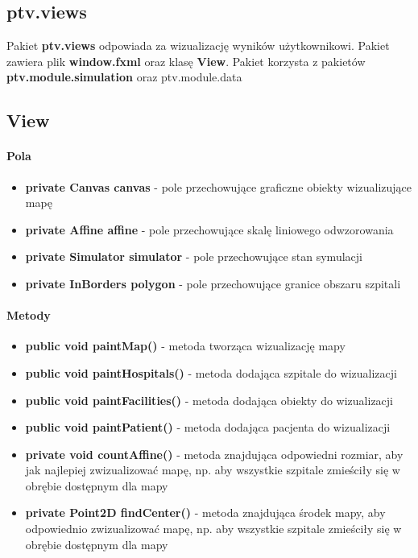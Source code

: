 \documentclass[]{article}
\begin{document}
        \subsection{ptv.views} %
        Pakiet \textbf{ptv.views} odpowiada za wizualizację wyników użytkownikowi. Pakiet zawiera plik \textbf{window.fxml} oraz klasę \textbf{View}. Pakiet korzysta z pakietów \textbf{ptv.module.simulation} oraz {ptv.module.data} 
        \subsection{View}
            \paragraph{Pola}
                    \begin{itemize}
                        \item \textbf{private Canvas canvas} - pole przechowujące graficzne obiekty wizualizujące mapę
                        \item \textbf{private Affine affine} - pole przechowujące skalę liniowego odwzorowania
                        \item \textbf{private Simulator simulator} - pole przechowujące stan symulacji
                        \item \textbf{private InBorders polygon} - pole przechowujące granice obszaru szpitali
                    \end{itemize}
                \paragraph{Metody}
                    \begin{itemize}
                        \item \textbf{public void paintMap()} - metoda tworząca wizualizację mapy
                        \item \textbf{public void paintHospitals()} - metoda dodająca szpitale do wizualizacji
                        \item \textbf{public void paintFacilities()} - metoda dodająca obiekty do wizualizacji
                        \item \textbf{public void paintPatient()} - metoda dodająca pacjenta do wizualizacji
                        \item \textbf{private void countAffine()} - metoda znajdująca odpowiedni rozmiar, aby jak najlepiej zwizualizować mapę, np. aby wszystkie szpitale zmieściły się w obrębie dostępnym dla mapy
                        \item \textbf{private Point2D findCenter()} - metoda znajdująca środek mapy, aby odpowiednio zwizualizować mapę, np. aby wszystkie szpitale zmieściły się w obrębie dostępnym dla mapy
                    \end{itemize}
\end{document}
